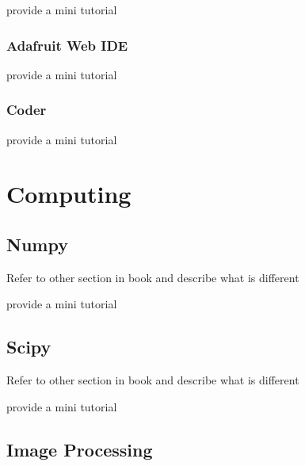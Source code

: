 \begin{exercise}
provide a mini tutorial 
\end{exercise}


\subsection{Adafruit Web IDE}


\begin{exercise}
provide a mini tutorial 
\end{exercise}

\subsection{Coder}


\begin{exercise}
provide a mini tutorial 
\end{exercise}

\chapter{Computing}

\section{Numpy}

Refer to other section in book and describe what is different

\begin{exercise}
provide a mini tutorial 
\end{exercise}

\section{Scipy}

Refer to other section in book and describe what is different

\begin{exercise}
provide a mini tutorial 
\end{exercise}

\section{Image Processing}

